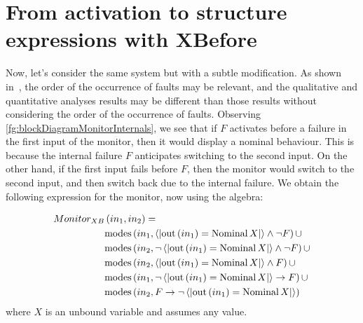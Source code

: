\section{From \ac*{activation} to structure expressions with \ac*{XBefore}}
\label{sec:activation-to-structure-expressions-algebra-operators}

Now, let's consider the same system but with a subtle modification.
As shown in~\cite{DM2016}, the order of the occurrence of faults may be relevant, and the qualitative and quantitative analyses results may be different than those results without considering the order of the occurrence of faults.
Observing \cref{fg:blockDiagramMonitorInternals}, we see that if $F$ activates before a failure in the first input of the monitor, then it would display a nominal behaviour.
This is because the internal failure $F$ anticipates switching to the second input.
On the other hand, if the first input fails before $F$, then the monitor would switch to the second input, and then switch back due to the internal failure.
We obtain the following expression for the monitor, now using the \ac{algebra}:

%
\begin{equation}
\label{eq:monitor-algebra}
\begin{split}
Monitor_{XB} &\left(in_1, in_2\right) = \\
  & \mathrm{modes}\left(in_1,\left\langle\left| \mathrm{out}\left(in_1\right) = \mathop{\mathrm{Nominal}} X \right|\right\rangle \land \lnot F\right) \cup\\
  & \mathrm{modes}\left(in_2,\lnot \left\langle\left| \mathrm{out}\left(in_1\right) = \mathop{\mathrm{Nominal}} X \right|\right\rangle \land \lnot F\right) \cup\\
  & \mathrm{modes}\left(in_2,\left\langle\left| \mathrm{out}\left(in_1\right) = \mathop{\mathrm{Nominal}} X \right|\right\rangle \land F\right) \cup\\
  & \mathrm{modes}\left(in_1,\lnot \left\langle\left| \mathrm{out}\left(in_1\right) = \mathop{\mathrm{Nominal}} X \right|\right\rangle \rightarrow F\right) \cup \\
  & \mathrm{modes}\left(in_2,F \rightarrow \lnot \left\langle\left| \mathrm{out}\left(in_1\right) = \mathop{\mathrm{Nominal}} X \right|\right\rangle\right)
\end{split}
\end{equation}
where $X$ is an unbound variable and assumes any value.

